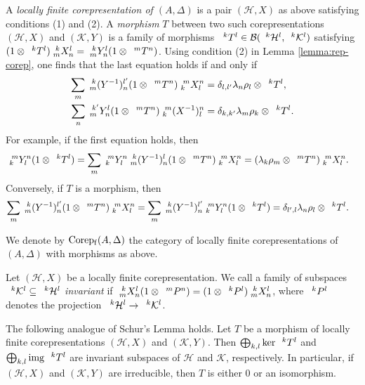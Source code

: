 A \emph{locally finite corepresentation of $(A,\Delta)$} is a pair
$(\mathcal{H},X)$ as above satisfying conditions (1) and (2). A
\emph{morphism} $T$ between two such corepresentations
$(\mathcal{H},X)$ and $(\mathcal{K},Y)$ is a family of morphisms
$\Gru{T}{k}{l} \in
\mathcal{B}(\Gru{\mathcal{H}}{k}{l},\Gru{\mathcal{K}}{k}{l})$
satisfying $(1 \otimes \Gru{T}{k}{l})\Gr{X}{k}{l}{m}{n} =
\Gr{Y}{k}{l}{m}{n}(1 \otimes \Gru{T}{m}{n})$.  Using condition (2) in
Lemma \ref{lemma:rep-corep}, one finds that the last equation holds if
and only if
  \begin{align} 
    \sum_{m} \Gr{(Y^{-1})}{k}{l'}{m}{n}(1 \otimes
    \Gru{T}{m}{n})\Gr{X}{m}{n}{k}{l} &= \delta_{l,l'}
    \lambda_{n}\rho_{l} \otimes \Gru{T}{k}{l}, \\
    \sum_{n} \Gr{Y}{k'}{l}{m}{n}(1 \otimes
    \Gru{T}{m}{n})\Gr{(X^{-1})}{m}{n}{k}{l} &= \delta_{k,k'}
    \lambda_{m} \rho_{k} \otimes \Gru{T}{k}{l}.
 \end{align}
For example, if the first equation holds, then
\begin{align*}
  \Gr{Y}{m}{n}{k}{l} (1 \otimes \Gru{T}{k}{l}) &=
  \sum_{m}  \Gr{Y}{m}{n}{k}{l} \Gr{(Y^{-1})}{k}{l}{m}{n}(1 \otimes
  \Gru{T}{m}{n})\Gr{X}{m}{n}{k}{l} = (\lambda_{k}\rho_{m}\otimes \Gru{T}{m}{n})\Gr{X}{m}{n}{k}{l}.
\end{align*}
Conversely, if $T$ is a morphism, then
\begin{align*}
  \sum_{m} \Gr{(Y^{-1})}{k}{l'}{m}{n}(1 \otimes
  \Gru{T}{m}{n})\Gr{X}{m}{n}{k}{l} &= \sum_{m}
  \Gr{(Y^{-1})}{k}{l'}{m}{n} \Gr{Y}{m}{n}{k}{l}(1 \otimes
  \Gru{T}{k}{l}) = \delta_{l',l} \lambda_{n}\rho_{l} \otimes
  \Gru{T}{k}{l}.
\end{align*}

We denote by $\Corep(A,\Delta)$ the category of locally finite
corepresentations of $(A,\Delta)$ with morphisms as above.


Let $(\mathcal{H},X)$ be a locally finite
corepresentation. We call a family of subspaces
$\Gru{\mathcal{K}}{k}{l} \subseteq \Gru{\mathcal{H}}{k}{l}$
\emph{invariant} if $\Gr{X}{k}{l}{m}{n}(1 \otimes \Gru{P}{m}{n}) =
(1\otimes \Gru{P}{k}{l})\Gr{X}{k}{l}{m}{n}$, where $\Gru{P}{k}{l}$
denotes the projection
$\Gru{\mathcal{H}}{k}{l}\to\Gru{\mathcal{K}}{k}{l}$.

The following analogue of Schur's Lemma holds.  Let $T$ be a morphism
of locally finite corepresentations $(\mathcal{H},X)$ and
$(\mathcal{K},Y)$. Then $ \bigoplus_{k,l} \ker \Gru{T}{k}{l}$ and
$\bigoplus_{k,l} \img \Gru{T}{k}{l}$ are invariant subspaces of
$\mathcal{H}$ and $\mathcal{K}$, respectively. In particular, if
$(\mathcal{H},X)$ and $(\mathcal{K},Y)$ are irreducible, then $T$ is
either $0$ or an isomorphism.


